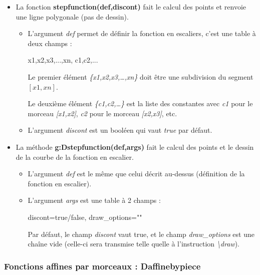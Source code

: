 \documentclass[%
10pt,%
a4paper,%
french,%
]%
{article}%
\begin{document}
\begin{itemize}
\item La fonction \textbf{stepfunction(def,discont)} fait le calcul des points et renvoie une ligne polygonale (pas de dessin).

  \begin{itemize}
  \item  L'argument \emph{def} permet de définir la fonction en escaliers, c'est une table à deux champs :

\begin{TeXcode}
  { {x1,x2,x3,...,xn}, {c1,c2,...} }
\end{TeXcode}

  Le premier élément \emph{\{x1,x2,x3,\ldots,xn\}} doit être une subdivision du segment \([x1,xn]\).
  
  Le deuxième élément \emph{\{c1,c2,\ldots\}} est la liste des constantes avec \emph{c1} pour le morceau \emph{{[}x1,x2{]}}, \emph{c2} pour le morceau \emph{{[}x2,x3{]}}, etc.
  
  \item   L'argument \emph{discont} est un booléen qui vaut \emph{true} par défaut.
  \end{itemize}
  
\item La méthode \textbf{g:Dstepfunction(def,args)} fait le calcul des points et le dessin de la courbe de la fonction en escalier.

  \begin{itemize}
  \item L'argument \emph{def} est le même que celui décrit au-dessus (définition de la fonction en escalier).
  \item L'argument \emph{args} est une table à 2 champs : 
  
\begin{TeXcode}
  { discont=true/false, draw_options="" }
\end{TeXcode}

  Par défaut, le champ \emph{discont} vaut true, et le champ \emph{draw\_options} est une chaîne vide (celle-ci sera transmise telle quelle à l'instruction \emph{\textbackslash draw}).
  \end{itemize}
\end{itemize}

\subsubsection{Fonctions affines par morceaux : Daffinebypiece}
\end{document}
